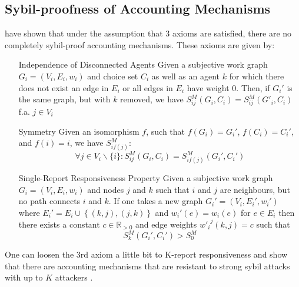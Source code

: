 \documentclass[11pt,a4paper]{article}
\theoremstyle{definition}
\theoremstyle{theorem}
\theoremstyle{proposition}
\theoremstyle{corollary}
\theoremstyle{lemma}
\theoremstyle{example}
\theoremstyle{remark}
\begin{document}
\subsection{Sybil-proofness of Accounting Mechanisms}
\label{subsec:On the Sybil-Proofness of Accounting Mechanisms} 
\cite{On the Sybil-Proofness of Accounting Mechanisms} have shown that under the assumption that 3 axioms are satisfied, there are no completely sybil-proof accounting mechanisms. These axioms are given by:
\begin{itemize}
\item[Independence of Disconnected Agents]Given a subjective work graph $G_i=(V_i,E_i,w_i)$ and choice set $C_i$ as well as an agent $k$ for which there does not exist an edge in $E_i$ or all edges in $E_i$ have weight 0. Then, if $G_i'$ is the same graph, but with $k$ removed, we have $S_{ij}^M(G_i,C_i)=S_{ij}^M(G'_i,C_i)$ f.a. $j\in{}V_i$
\item[Symmetry]Given an isomorphism $f$, such that $f(G_i)=G_i'$, $f(C_i)=C_i'$, and $f(i)=i$, we have $S^M_{if(j)}$:
\begin{equation}
\forall{}j\in{}V_i\backslash{}\{i\}:S_{ij}^M(G_i,C_i)=S_{if(j)}^M(G_i',C_i')
\end{equation}
\item[Single-Report Responsiveness Property]Given a subjective work graph $G_i=(V_i,E_i,w_i)$ and nodes $j$ and $k$ such that $i$ and $j$ are neighbours, but no path connects $i$ and $k$. If one takes a new graph $G_i'=(V_i,E_i',w_i')$ where $E_i'=E_i\cup{}\left\lbrace{}(k,j),(j,k)\right\rbrace$ and $w_i'(e)=w_i(e)$ for $e\in{}E_i$ then there exists a constant $c\in\mathbb{R}_{>0}$ and edge weights ${w'_i}^j(k,j)=c$ such that 
\begin{equation}
S_k^M(G_i',C_i')>S_0^M
\end{equation}
\end{itemize} 
One can loosen the 3rd axiom a little bit to K-report responsiveness and show that there are accounting mechanisms that are resistant to strong sybil attacks with up to $K$ attackers \cite{On the Sybil-Proofness of Accounting Mechanisms}.
\end{document}
